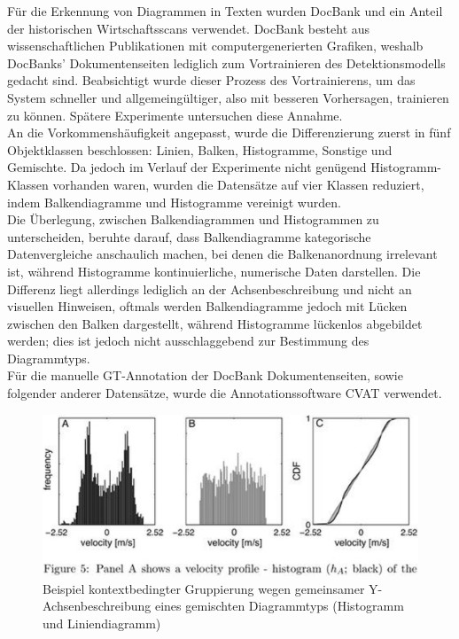 Für die Erkennung von Diagrammen in Texten wurden DocBank \cite{li2020docbank} und ein Anteil der historischen Wirtschaftsscans verwendet. DocBank besteht aus wissenschaftlichen Publikationen mit computergenerierten Grafiken, weshalb DocBanks' Dokumentenseiten lediglich zum Vortrainieren des Detektionsmodells gedacht sind. Beabsichtigt wurde dieser Prozess des Vortrainierens, um das System schneller und allgemeingültiger, also mit besseren Vorhersagen, trainieren zu können. Spätere Experimente untersuchen diese Annahme.
\\
An die Vorkommenshäufigkeit angepasst, wurde die Differenzierung zuerst in fünf Objektklassen beschlossen: Linien, Balken, Histogramme, Sonstige und Gemischte. Da jedoch im Verlauf der Experimente nicht genügend Histogramm-Klassen vorhanden waren, wurden die Datensätze auf vier Klassen reduziert, indem Balkendiagramme und Histogramme vereinigt wurden.
\\
Die Überlegung, zwischen Balkendiagrammen und Histogrammen zu unterscheiden, beruhte darauf, dass Balkendiagramme kategorische Datenvergleiche anschaulich machen, bei denen die Balkenanordnung irrelevant ist, während Histogramme kontinuierliche, numerische Daten darstellen. Die Differenz liegt allerdings lediglich an der Achsenbeschreibung und nicht an visuellen Hinweisen, oftmals werden Balkendiagramme jedoch mit Lücken zwischen den Balken dargestellt, während Histogramme lückenlos abgebildet werden; dies ist jedoch nicht ausschlaggebend zur Bestimmung des Diagrammtyps.
\\
Für die manuelle GT-Annotation der DocBank Dokumentenseiten, sowie folgender anderer Datensätze, wurde die Annotationssoftware CVAT \cite{CVAT_ai_Corporation_Computer_Vision_Annotation_2023} verwendet.

\begin{figure}[h!]
    \centering
    \captionsetup{width=.75\linewidth}
    \includegraphics[width=.75\textwidth]{Methodik/img/docbank_example.png}
    \caption{ Beispiel kontextbedingter Gruppierung wegen gemeinsamer Y-Achsenbeschreibung eines gemischten Diagrammtyps (Histogramm und Liniendiagramm)}
    \label{fig:docbank_example}
\end{figure}

